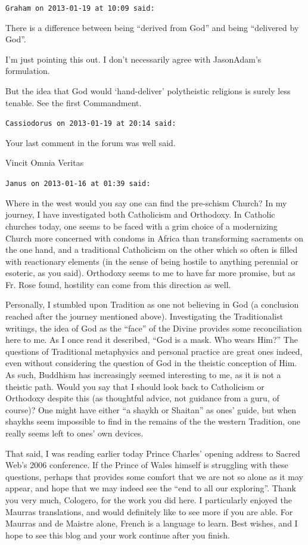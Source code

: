 \begin{footnotesize}
\begin{sffamily}
\hfill

\texttt{Graham on 2013-01-19 at 10:09 said:}

There is a difference between being ``derived from God'' and being ``delivered by God''.

I'm just pointing this out. I don't necessarily agree with JasonAdam's formulation.

But the idea that God would `hand-deliver' polytheistic religions is surely less tenable. See the first Commandment.

\hfill

\texttt{Cassiodorus on 2013-01-19 at 20:14 said:}

Your last comment in the forum was well said.

Vincit Omnia Veritas

\hfill

\texttt{Janus on 2013-01-16 at 01:39 said:}

Where in the west would you say one can find the pre-schism Church? In my journey, I have investigated both Catholicism and Orthodoxy. In Catholic churches today, one seems to be faced with a grim choice of a modernizing Church more concerned with condoms in Africa than transforming sacraments on the one hand, and a traditional Catholicism on the other which so often is filled with reactionary elements (in the sense of being hostile to anything perennial or esoteric, as you said). Orthodoxy seems to me to have far more promise, but as Fr. Rose found, hostility can come from this direction as well.

Personally, I stumbled upon Tradition as one not believing in God (a conclusion reached after the journey mentioned above). Investigating the Traditionalist writings, the idea of God as the ``face'' of the Divine provides some reconciliation here to me. As I once read it described, ``God is a mask. Who wears Him?'' The questions of Traditional metaphysics and personal practice are great ones indeed, even without considering the question of God in the theistic conception of Him. As such, Buddhism has increasingly seemed interesting to me, as it is not a theistic path. Would you say that I should look back to Catholicism or Orthodoxy despite this (as thoughtful advice, not guidance from a guru, of course)? One might have either ``a shaykh or Shaitan'' as ones' guide, but when shaykhs seem impossible to find in the remains of the the western Tradition, one really seems left to ones' own devices.

That said, I was reading earlier today Prince Charles' opening address to Sacred Web's 2006 conference. If the Prince of Wales himself is struggling with these questions, perhaps that provides some comfort that we are not so alone as it may appear, and hope that we may indeed see the ``end to all our exploring''. Thank you very much, Cologero, for the work you did here. I particularly enjoyed the Maurras translations, and would definitely like to see more if you are able. For Maurras and de Maistre alone, French is a language to learn. Best wishes, and I hope to see this blog and your work continue after you finish.


\end{sffamily}
\end{footnotesize}
